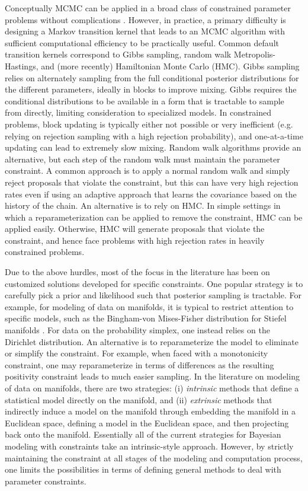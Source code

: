 \documentclass[10pt]{article}
\DeclareMathOperator{\1}{\mathbbm{1}}
\begin{document}
Conceptually MCMC can be applied in a broad class of constrained parameter
problems without complications \citep{gelfand1992bayesian}. However, in
practice, a primary difficulty is designing a Markov transition kernel that
leads to an MCMC algorithm with sufficient computational efficiency to be
practically useful. Common default transition kernels correspond to Gibbs
sampling, random walk Metropolis-Hastings, and (more recently) Hamiltonian
Monte Carlo (HMC). Gibbs sampling relies on alternately sampling from the
full conditional posterior distributions for the different parameters,
ideally in blocks to improve mixing. Gibbs requires the conditional
distributions to be available in a form that is tractable to sample from
directly, limiting consideration to specialized models. In constrained
problems, block updating is typically either not possible or very
inefficient (e.g. relying on rejection sampling with a high rejection
probability), and one-at-a-time updating can lead to extremely slow mixing.
Random walk algorithms provide an alternative, but each step of the random
walk must maintain the parameter constraint. A common approach is to apply
a normal random walk and simply reject proposals that violate the
constraint, but this can have very high rejection rates even if using an
adaptive approach that learns the covariance based on the history of the
chain. An alternative is to rely on HMC. In simple settings in which a
reparameterization can be applied to remove the constraint, HMC can be
applied easily. Otherwise, HMC will generate proposals that violate the
constraint, and hence face problems with high rejection rates in heavily
constrained problems.

Due to the above hurdles, most of the focus in the literature has been on
customized solutions developed for specific constraints.  One popular
strategy is to carefully pick a prior and likelihood such that posterior
sampling is tractable. For example, for modeling of data on manifolds, it
is typical to restrict attention to specific models, such as the
Bingham-von Mises-Fisher distribution for Stiefel manifolds
\citep{khatri1977mises,hoff2009simulation}. For data on the probability
simplex, one instead relies on the Dirichlet distribution. An alternative
is to reparameterize the model to eliminate or simplify the constraint. For
example, when faced with a monotonicity constraint, one may reparameterize
in terms of differences as the resulting positivity constraint leads to
much easier sampling. In the literature on modeling of data on manifolds,
there are two strategies: (i) {\em intrinsic} methods that define a
statistical model directly on the manifold, and (ii) {\em extrinsic}
methods that indirectly induce a model on the manifold through embedding
the manifold in a Euclidean space, defining a model in the Euclidean space,
and then projecting back onto the manifold. Essentially all of the current
strategies for Bayesian modeling with constraints take an intrinsic-style
approach. However, by strictly maintaining the constraint at all stages of
the modeling and computation process, one limits the possibilities in terms
of defining general methods to deal with parameter constraints.
\end{document}
